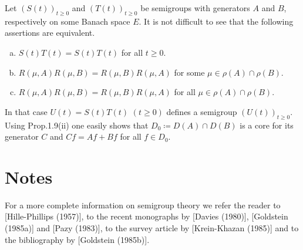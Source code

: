 Let $(S(t))_{t\geq 0}$ and $(T(t))_{t\geq 0}$ be semigroups with generators $A$ and $B$, respectively on some Banach space $E$.
It is not difficult to see that the following assertions are equivalent.
\begin{enumerate}[(a)]
\item 
$S(t)T(t) = S(t)T(t)$ for all $t \geq 0$.

\item 
$R(\mu,A)R(\mu,B) = R(\mu,B)R(\mu,A)$ for some $\mu \in \rho(A) \cap \rho(B)$.

\item 
$R(\mu,A)R(\mu,B) = R(\mu,B)R(\mu,A)$ for all $\mu \in \rho(A) \cap \rho(B)$.

\end{enumerate}
In that case $U(t) = S(t)T(t)$ $(t \geq 0)$ defines a semigroup $(U(t))_{t\geq 0}$.
Using Prop.1.9(ii) 
one easily shows that $D_{0} \coloneqq D(A) \cap D(B)$ is a core for its generator $C$ and $Cf = Af + Bf$ for all $f \in D_{0}$.

\section*{Notes}

For a more complete information on semigroup theory we refer the reader to [Hille-Phillips (1957)], to the recent monographs by [Davies (1980)], 
[Goldstein (1985a)] and [Pazy (1983)], to the survey article by 
[Krein-Khazan (1985)] and to the bibliography by [Goldstein (1985b)].



